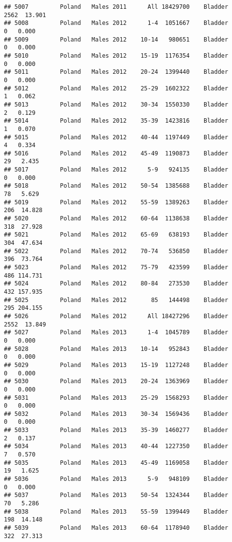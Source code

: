\documentclass[
]{article}
\begin{document}
\begin{verbatim}
## 5007         Poland   Males 2011      All 18429700    Bladder   2562  13.901
## 5008         Poland   Males 2012      1-4  1051667    Bladder      0   0.000
## 5009         Poland   Males 2012    10-14   980651    Bladder      0   0.000
## 5010         Poland   Males 2012    15-19  1176354    Bladder      0   0.000
## 5011         Poland   Males 2012    20-24  1399440    Bladder      0   0.000
## 5012         Poland   Males 2012    25-29  1602322    Bladder      1   0.062
## 5013         Poland   Males 2012    30-34  1550330    Bladder      2   0.129
## 5014         Poland   Males 2012    35-39  1423816    Bladder      1   0.070
## 5015         Poland   Males 2012    40-44  1197449    Bladder      4   0.334
## 5016         Poland   Males 2012    45-49  1190873    Bladder     29   2.435
## 5017         Poland   Males 2012      5-9   924135    Bladder      0   0.000
## 5018         Poland   Males 2012    50-54  1385688    Bladder     78   5.629
## 5019         Poland   Males 2012    55-59  1389263    Bladder    206  14.828
## 5020         Poland   Males 2012    60-64  1138638    Bladder    318  27.928
## 5021         Poland   Males 2012    65-69   638193    Bladder    304  47.634
## 5022         Poland   Males 2012    70-74   536850    Bladder    396  73.764
## 5023         Poland   Males 2012    75-79   423599    Bladder    486 114.731
## 5024         Poland   Males 2012    80-84   273530    Bladder    432 157.935
## 5025         Poland   Males 2012       85   144498    Bladder    295 204.155
## 5026         Poland   Males 2012      All 18427296    Bladder   2552  13.849
## 5027         Poland   Males 2013      1-4  1045789    Bladder      0   0.000
## 5028         Poland   Males 2013    10-14   952843    Bladder      0   0.000
## 5029         Poland   Males 2013    15-19  1127248    Bladder      0   0.000
## 5030         Poland   Males 2013    20-24  1363969    Bladder      0   0.000
## 5031         Poland   Males 2013    25-29  1568293    Bladder      0   0.000
## 5032         Poland   Males 2013    30-34  1569436    Bladder      0   0.000
## 5033         Poland   Males 2013    35-39  1460277    Bladder      2   0.137
## 5034         Poland   Males 2013    40-44  1227350    Bladder      7   0.570
## 5035         Poland   Males 2013    45-49  1169058    Bladder     19   1.625
## 5036         Poland   Males 2013      5-9   948109    Bladder      0   0.000
## 5037         Poland   Males 2013    50-54  1324344    Bladder     70   5.286
## 5038         Poland   Males 2013    55-59  1399449    Bladder    198  14.148
## 5039         Poland   Males 2013    60-64  1178940    Bladder    322  27.313

\end{verbatim}
\end{document}
